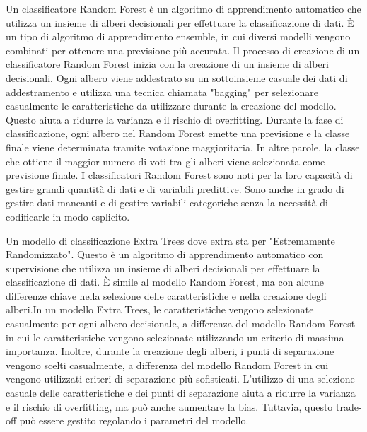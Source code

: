 \documentclass[italian,12pt,a4paper]{article}
\begin{document}
    
    Un classificatore Random Forest è un algoritmo di apprendimento automatico che utilizza un insieme di alberi decisionali per effettuare la classificazione di dati. È un tipo di algoritmo di apprendimento ensemble, in cui diversi modelli vengono combinati per ottenere una previsione più accurata. Il processo di creazione di un classificatore Random Forest inizia con la creazione di un insieme di alberi decisionali. Ogni albero viene addestrato su un sottoinsieme casuale dei dati di addestramento e utilizza una tecnica chiamata "bagging" per selezionare casualmente le caratteristiche da utilizzare durante la creazione del modello. Questo aiuta a ridurre la varianza e il rischio di overfitting. Durante la fase di classificazione, ogni albero nel Random Forest emette una previsione e la classe finale viene determinata tramite votazione maggioritaria. In altre parole, la classe che ottiene il maggior numero di voti tra gli alberi viene selezionata come previsione finale. I classificatori Random Forest sono noti per la loro capacità di gestire grandi quantità di dati e di variabili predittive. Sono anche in grado di gestire dati mancanti e di gestire variabili categoriche senza la necessità di codificarle in modo esplicito.
    \\
    \vspace{25pt}

    Un modello di classificazione Extra Trees dove extra sta per "Estremamente Randomizzato". Questo è un algoritmo di apprendimento automatico con supervisione che utilizza un insieme di alberi decisionali per effettuare la classificazione di dati. È simile al modello Random Forest, ma con alcune differenze chiave nella selezione delle caratteristiche e nella creazione degli alberi.In un modello Extra Trees, le caratteristiche vengono selezionate casualmente per ogni albero decisionale, a differenza del modello Random Forest in cui le caratteristiche vengono selezionate utilizzando un criterio di massima importanza. Inoltre, durante la creazione degli alberi, i punti di separazione vengono scelti casualmente, a differenza del modello Random Forest in cui vengono utilizzati criteri di separazione più sofisticati. L'utilizzo di una selezione casuale delle caratteristiche e dei punti di separazione aiuta a ridurre la varianza e il rischio di overfitting, ma può anche aumentare la bias. Tuttavia, questo trade-off può essere gestito regolando i parametri del modello.
    \\
    \vspace{25pt}
\end{document}

